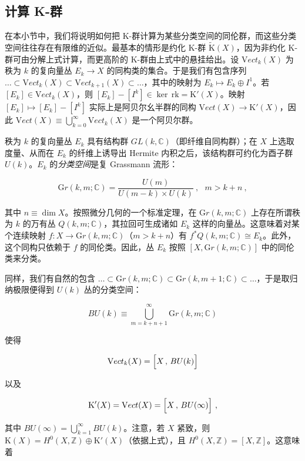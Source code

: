 \documentclass[11pt,a4paper]{ctexart}
\newcommand{\SrcRange}[2]{\marginpar{\raggedright\footnotesize 原文 p.#1}}
\begin{document}
\SrcRange{23}{23}
\subsection{计算 K-群}\label{ux8ba1ux7b97-k-ux7fa4}

在本小节中，我们将说明如何把 K-群计算为某些分类空间的同伦群，而这些分类空间往往存在有限维的近似。最基本的情形是约化 K-群 \(\widetilde{{\mathrm K}}(X)\)，因为非约化 K-群可由分解上式计算，而更高阶的 K-群由上式中的悬挂给出。设 \({\mathrm Vect}_k(X)\) 为秩为 \(k\) 的复向量丛 \(E_k\rightarrow X\) 的同构类的集合。于是我们有包含序列 \(\ldots\subset {\mathrm Vect}_k(X)\subset {\mathrm Vect}_{k+1}(X)\subset\ldots\)，其中的映射为 \(E_k\mapsto E_k\oplus I^1\)。若 \([E_k]\in {\mathrm Vect}_k(X)\)，则 \([E_k]-[I^k]\in \ker\,\mathrm{rk}= {\mathrm K}'(X)\)。映射 \([E_k]\mapsto [E_k]-[I^k]\) 实际上是阿贝尔幺半群的同构 \({\mathrm Vect}(X)\rightarrow {\mathrm K}'(X)\)，因此 \({\mathrm Vect}(X)\equiv\bigcup_{k=0}^{\infty}{\mathrm Vect}_k(X)\) 是一个阿贝尔群。

秩为 \(k\) 的复向量丛 \(E_k\) 具有结构群 \(GL(k,{\mathbb{C}})\)（即纤维自同构群）；在 \(X\) 上选取度量、从而在 \(E_k\) 的纤维上诱导出 Hermite 内积之后，该结构群可约化为酉子群 \(U(k)\)。\(E_k\) 的\emph{分类空间}是复 Grassmann 流形：

\[{\mathrm Gr}(k,m;{\mathbb{C}})=\frac{U(m)}{U(m-k)\times U(k)}\ ,  \ \ \ m>k+n\ ,\]

其中 \(n\equiv\dim X\)。按照微分几何的一个标准定理，在 \({\mathrm Gr}(k,m;{\mathbb{C}})\) 上存在所谓秩为 \(k\) 的万有丛 \(Q(k,m;{\mathbb{C}})\)，其拉回可生成诸如 \(E_k\) 这样的向量丛。这意味着对某个连续映射 \(f: X\rightarrow{\mathrm Gr}(k,m;{\mathbb{C}})\)（\(m>k+n\)）有 \(f^*Q(k,m;{\mathbb{C}})\cong E_k\)。此外，这个同构只依赖于 \(f\) 的同伦类。因此，丛 \(E_k\) 按照 \([X,{\mathrm Gr}(k,m;{\mathbb{C}})]\) 中的同伦类来分类。

同样，我们有自然的包含 \(\ldots \subset{\mathrm Gr}(k,m;{\mathbb{C}})\subset {\mathrm Gr}(k,m+1;{\mathbb{C}})\subset \ldots\)，于是取归纳极限便得到 \(U(k)\) 丛的分类空间：

\[BU(k)\equiv \bigcup_{m=k+n+1}^{\infty}{\mathrm Gr}(k,m;{\mathbb{C}})\]

使得

\[{\mathrm Vect}_k(X)=\Bigl[X\,,\,BU(k)\Bigr]\]

以及

\[{\mathrm K}'(X)= {\mathrm Vect}(X)=\Bigl[X\,,\,BU(\infty)\Bigr]\ ,\]

其中 \(BU(\infty)=\bigcup_{k=1}^{\infty}BU(k)\)。注意，若 \(X\) 紧致，则 \({\mathrm K}(X)= H^0(X,{\mathbb{Z}})\oplus {\mathrm K}'(X)\)（依据上式），且 \(H^0(X,{\mathbb{Z}})= [X,{\mathbb{Z}}]\)。这意味着
\end{document}
